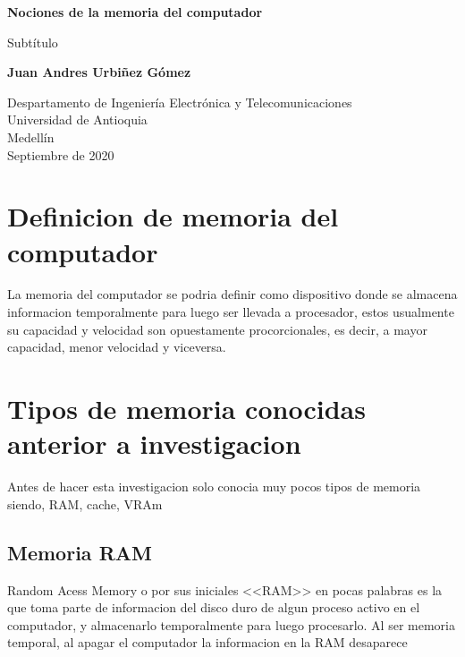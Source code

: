 \documentclass{article}
\begin{document}
\begin{titlepage}
    \begin{center}
        \vspace*{1cm}
            
        \Huge
        \textbf{Nociones de la memoria del computador}
            
        \vspace{0.5cm}
        \LARGE
        Subtítulo
            
        \vspace{1.5cm}
            
        \textbf{Juan Andres Urbiñez Gómez}
            
        \vfill
            
        \vspace{0.8cm}
            
        \Large
        Despartamento de Ingeniería Electrónica y Telecomunicaciones\\
        Universidad de Antioquia\\
        Medellín\\
        Septiembre de 2020
            
    \end{center}
\end{titlepage}

\tableofcontents
\newpage
\section{Definicion de memoria del computador}
La memoria del computador se podria definir como dispositivo donde se almacena informacion temporalmente para luego ser llevada a procesador, estos usualmente su capacidad y velocidad son opuestamente procorcionales, es decir, a mayor capacidad, menor velocidad y viceversa.
\section{Tipos de memoria conocidas anterior a investigacion} 
Antes de hacer esta investigacion solo conocia muy pocos tipos de memoria siendo, RAM, cache, VRAm

\subsection{Memoria RAM}
Random Acess Memory o por sus iniciales <<RAM>> en pocas palabras es la que toma parte de informacion del disco duro de algun proceso activo en el computador, y almacenarlo temporalmente para luego procesarlo. Al ser memoria temporal, al apagar el computador la informacion en la RAM  desaparece
\end{document}
